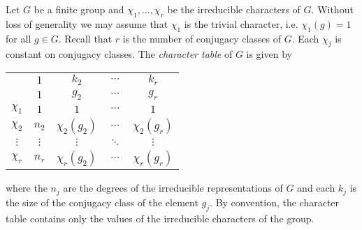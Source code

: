 Let $G$ be a finite group and $\chi_1,\dots,\chi_r$ be the irreducible characters of $G$. Without loss of generality
we may assume that $\chi_1$ is the trivial character, i.e. $\chi_1(g)=1$ for all $g\in G$. 
Recall that $r$ is the number of conjugacy classes of $G$. Each $\chi_j$ is constant on conjugacy classes. 
The \emph{character table} of 
$G$ is given by 
\begin{center}
\begin{tabular}{|c|cccc|}
\hline 
 & $1$ & $k_{2}$ & $\cdots$ & $k_{r}$\tabularnewline
 & $1$ & $g_{2}$ & $\cdots$ & $g_{r}$\tabularnewline
\hline 
$\chi_{1}$ & $1$ & $1$ & $\cdots$ & $1$\tabularnewline
$\chi_{2}$ & $n_{2}$ & $\chi_{2}(g_{2})$ & $\cdots$ & $\chi_{2}(g_{r})$\tabularnewline
$\vdots$ & $\vdots$ & $\vdots$ & $\ddots$ & $\vdots$\tabularnewline
$\chi_{r}$ & $n_{r}$ & $\chi_{r}(g_{2})$ & $\cdots$ & $\chi_{r}(g_{r})$\tabularnewline
\hline
\end{tabular}
\end{center}
where the $n_j$ are the degrees of the irreducible representations of $G$ and each $k_j$ is 
the size of the conjugacy class of the element $g_j$. By convention, the character table
contains only the values of the irreducible characters of the group. 

